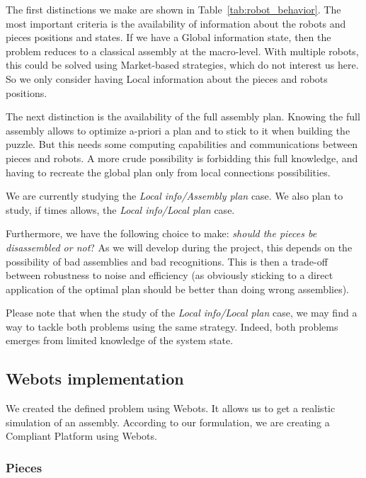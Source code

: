 \documentclass[letterpaper, oneside]{article}
\begin{document}
The first distinctions we make are shown in Table~\ref{tab:robot_behavior}. The most important criteria is the availability of information about the robots and pieces positions and states. If we have a Global information state, then the problem reduces to a classical assembly at the macro-level. With multiple robots, this could be solved using Market-based strategies, which do not interest us here. So we only consider having Local information about the pieces and robots positions.

The next distinction is the availability of the full assembly plan. Knowing the full assembly allows to optimize a-priori a plan and to stick to it when building the puzzle. But this needs some computing capabilities and communications between pieces and robots. A more crude possibility is forbidding this full knowledge, and having to recreate the global plan only from local connections possibilities.

We are currently studying the \emph{Local info/Assembly plan} case. We also plan to study, if times allows, the \emph{Local info/Local plan} case.

Furthermore, we have the following choice to make: \emph{should the pieces be disassembled or not}?
As we will develop during the project, this depends on the possibility of bad assemblies and bad recognitions. This is then a trade-off between robustness to noise and efficiency (as obviously sticking to a direct application of the optimal plan should be better than doing wrong assemblies).

Please note that when the study of the \emph{Local info/Local plan} case, we may find a way to tackle both problems using the same strategy. Indeed, both problems emerges from limited knowledge of the system state.

\subsection{Webots implementation} %
\label{sub:webots_implementation}

We created the defined problem using Webots. It allows us to get a realistic simulation of an assembly. According to our formulation, we are creating a Compliant Platform using Webots.

\subsubsection{Pieces} %
\label{ssub:pieces}
\end{document}
